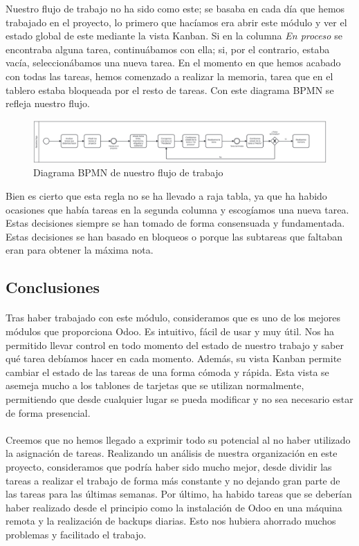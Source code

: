 Nuestro flujo de trabajo no ha sido como este; se basaba en cada día que hemos trabajado en el proyecto, lo primero que hacíamos era abrir este módulo y ver el estado global de este mediante la vista Kanban. Si en la columna \textit{En proceso} se encontraba alguna tarea, continuábamos con ella; si, por el contrario, estaba vacía, seleccionábamos una nueva tarea. En el momento en que hemos acabado con todas las tareas, hemos comenzado a realizar la memoria, tarea que en el tablero estaba bloqueada por el resto de tareas. Con este diagrama BPMN se refleja nuestro flujo.

\begin{figure}[h]
    \centering
    \includegraphics[width=1\linewidth]{ProjectsBPMN_2.png}
    \caption{Diagrama BPMN de nuestro flujo de trabajo}
\end{figure}

Bien es cierto que esta regla no se ha llevado a raja tabla, ya que ha habido ocasiones que había tareas en la segunda columna y escogíamos una nueva tarea. Estas decisiones siempre se han tomado de forma consensuada y fundamentada. Estas decisiones se han basado en bloqueos o porque las subtareas que faltaban eran para obtener la máxima nota.

\subsection{Conclusiones}
\paragraph{}
Tras haber trabajado con este módulo, consideramos que es uno de los mejores módulos que proporciona Odoo. Es intuitivo, fácil de usar y muy útil. Nos ha permitido llevar control en todo momento del estado de nuestro trabajo y saber qué tarea debíamos hacer en cada momento. Además, su vista Kanban permite cambiar el estado de las tareas de una forma cómoda y rápida. Esta vista se asemeja mucho a los tablones de tarjetas que se utilizan normalmente, permitiendo que desde cualquier lugar se pueda modificar y no sea necesario estar de forma presencial.
\paragraph{}
Creemos que no hemos llegado a exprimir todo su potencial al no haber utilizado la asignación de tareas. Realizando un análisis de nuestra organización en este proyecto, consideramos que podría haber sido mucho mejor, desde dividir las tareas a realizar el trabajo de forma más constante y no dejando gran parte de las tareas para las últimas semanas. Por último, ha habido tareas que se deberían haber realizado desde el principio como la instalación de Odoo en una máquina remota y la realización de backups diarias. Esto nos hubiera ahorrado muchos problemas y facilitado el trabajo.

